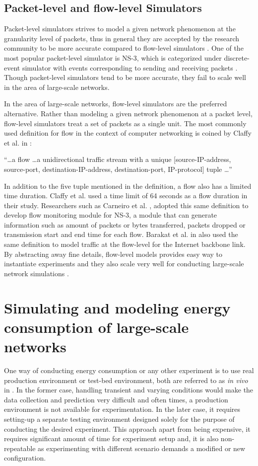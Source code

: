 \subsection{Packet-level and flow-level Simulators}
\label{section:packetflow} 
Packet-level simulators strives to model a given network phenomenon at the granularity level of packets, thus in general they are accepted by the research community to be more accurate compared to flow-level simulators \cite{DBLP:journals/jpdc/CasanovaGLQS14}. One of the most popular packet-level simulator is NS-3, which is categorized under discrete-event simulator with events corresponding to sending and receiving packets \cite{ns3}. Though packet-level simulators tend to be more accurate, they fail to scale well in the area of large-scale networks. 

In the area of large-scale networks, flow-level simulators are the preferred alternative. Rather than modeling a given network phenomenon at a packet level, flow-level simulators treat a set of packets as a single unit. The most commonly used definition for flow in the context of computer networking is coined by Claffy et al. in \cite{claffy1998nature}: 

``\ldots a flow \ldots a unidirectional traffic stream with a unique [source-IP-address, source-port, destination-IP-address, destination-port, IP-protocol] tuple \ldots''

In addition to the five tuple mentioned in the definition, a flow also has a limited time duration. Claffy et al. used a time limit of 64 seconds as a flow duration in their study. Researchers such as Carneiro et al. \cite{DBLP:conf/valuetools/CarneiroFR09}, adopted this same definition to develop flow monitoring module for NS-3, a module that can generate information such as amount of packets or bytes transferred, packets dropped or transmission start and end time for each flow. Barakat et al. in \cite{DBLP:journals/tsp/BarakatTIDO03} also used the same definition to model traffic at the flow-level for the Internet backbone link. By abstracting away fine details, flow-level models provides easy way to instantiate experiments and they also scale very well for conducting large-scale network simulations \cite{DBLP:journals/jpdc/CasanovaGLQS14,DBLP:journals/tsp/BarakatTIDO03}.
\section{Simulating and modeling energy consumption of large-scale networks}
One way of conducting energy consumption or any other experiment is to use real production environment or test-bed environment, both are referred to as \emph{in vivo} in  \cite{DBLP:journals/jpdc/CasanovaGLQS14}. In the former case, handling transient and varying conditions would make the data collection and prediction very difficult and often times, a production environment is not available for experimentation. In the later case, it requires setting-up a separate testing environment designed solely for the purpose of conducting the desired experiment. This approach apart from being expensive, it requires significant amount of time for experiment setup and, it is also non-repeatable as experimenting with different scenario demands a modified or new configuration.

